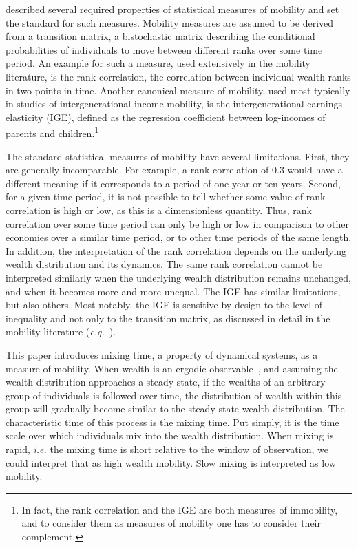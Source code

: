 \documentclass[11pt]{article}
\newcommand{\ie}{{\it i.e.}\xspace}
\newcommand{\eg}{{\it e.g.}\xspace}
\numberwithin{equation}{section}
\begin{document}
\citet{Shorrocks1978} described several required properties of statistical measures of mobility and set the standard for such measures. Mobility measures are assumed to be derived from a transition matrix, a bistochastic matrix describing the conditional probabilities of individuals to move between different ranks over some time period. An example for such a measure, used extensively in the mobility literature, is the rank correlation, the correlation between individual wealth ranks in two points in time. Another canonical measure of mobility, used most typically in studies of intergenerational income mobility, is the intergenerational earnings elasticity (IGE), defined as the regression coefficient between log-incomes of parents and children.\footnote{In fact, the rank correlation and the IGE are both measures of immobility, and to consider them as measures of mobility one has to consider their complement.}

The standard statistical measures of mobility have several limitations. First, they are generally incomparable. For example, a rank correlation of 0.3 would have a different meaning if it corresponds to a period of one year or ten years. Second, for a given time period, it is not possible to tell whether some value of rank correlation is high or low, as this is a dimensionless quantity. Thus, rank correlation over some time period can only be high or low in comparison to other economies over a similar time period, or to other time periods of the same length.
In addition, the interpretation of the rank correlation depends on the underlying wealth distribution and its dynamics. The same rank correlation cannot be interpreted similarly when the underlying wealth distribution remains unchanged, and when it becomes more and more unequal.
The IGE has similar limitations, but also others. Most notably, the IGE is sensitive by design to the level of inequality and not only to the transition matrix, as discussed in detail in the mobility literature (\eg~\citet{chettyETAL2014}).

This paper introduces mixing time, a property of dynamical systems, as a measure of mobility. When wealth is an ergodic observable~\citep{PetersAdamou2018c}, and assuming the wealth distribution approaches a steady state, if the wealths of an arbitrary group of individuals is followed over time, the distribution of wealth within this group will gradually become similar to the steady-state wealth distribution. The characteristic time of this process is the mixing time. Put simply, it is the time scale over which individuals mix into the wealth distribution. When mixing is rapid, \ie the mixing time is short relative to the window of observation, we could interpret that as high wealth mobility. Slow mixing is interpreted as low mobility.
\end{document}
